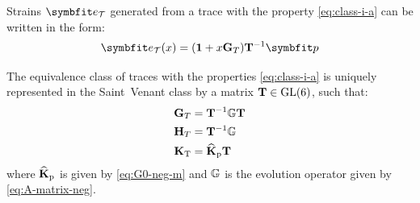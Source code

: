 Strains \(\TraceStrain\) generated from a trace with the property \eqref{eq:class-i-a} can be written in the form:
\begin{equation}
\TraceStrain(x) 
=(\mathbf{1} + x\TraceEvolveEE)\TraceDeDpRoot\bm{p}
\label{eq:def-T0}
\end{equation}

The equivalence class of traces with the properties \eqref{eq:class-i-a} is uniquely represented in the Saint~Venant class by a matrix \(\mathbf{T} \in\mathrm{GL}(6)\), such that:
\begin{subequations}
    \begin{align} 
        \mathbf{G}_T &= {\mathbf{T}^{-1}} \mathbb{G} \mathbf{T} \\
        {\mathbf{H}}_T &= {\mathbf{T}^{-1}} \mathbb{G} \label{eq:res-d1} \\
        \mathbf{K}_{\rm T} &= \widehat{\mathbf{K}}_{\rm p} \mathbf{T} \label{eq:def-CT}
    \end{align}
\end{subequations}
where \(\widehat{\mathbf{K}}_{\rm p}\) is given by \eqref{eq:G0-neg-m} and 
\(\mathbb{G}\) is the evolution operator given by \eqref{eq:A-matrix-neg}.

